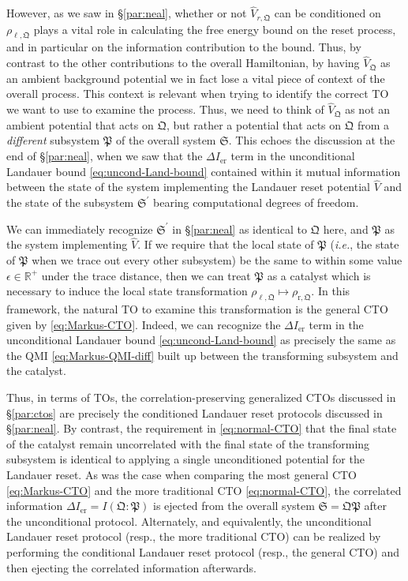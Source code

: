 \documentclass[preprints,article,accept,moreauthors,pdftex]{Definitions/mdpi}
\begin{document}
\begin{paracol}{2}
However, as we saw in \S\ref{par:neal}, whether or not $\widehat{V}_{r,\mathfrak{Q}}$ can be conditioned on $\rho_{\ell,\mathfrak{Q}}$ plays a vital role in calculating the free energy bound on the reset process, and in particular on the information contribution to the bound. Thus, by contrast to the other contributions to the overall Hamiltonian, by having $\widehat{V}_{\mathfrak{Q}}$ as an ambient background potential we in fact lose a vital piece of context of the overall process. This context is relevant when trying to identify the correct TO we want to use to examine the process. Thus, we need to think of $\widehat{V}_{\mathfrak{Q}}$ as not an ambient potential that acts on $\mathfrak{Q}$, but rather a potential that acts on $\mathfrak{Q}$ from a \emph{different} subsystem $\mathfrak{P}$ of the overall system $\mathfrak{S}$. This echoes the discussion at the end of \S\ref{par:neal}, when we saw that the $\Delta I_{\mathrm{er}}$ term in the unconditional Landauer bound \eqref{eq:uncond-Land-bound} contained within it mutual information between the state of the system implementing the Landauer reset potential $\widehat{V}$ and the state of the subsystem $\mathfrak{S}^{\prime}$ bearing computational degrees of freedom.

We can immediately recognize $\mathfrak{S}^{\prime}$ in \S\ref{par:neal} as identical to $\mathfrak{Q}$ here, and $\mathfrak{P}$ as the system implementing $\widehat{V}$. If we require that the local state of $\mathfrak{P}$ (\emph{i.e.}, the state of $\mathfrak{P}$ when we trace out every other subsystem) be the same to within some value $\epsilon \in \mathbb{R}^{+}$ under the trace distance, then we can treat $\mathfrak{P}$ as a catalyst which is necessary to induce the local state transformation $\rho_{\ell,\mathfrak{Q}} \mapsto \rho_{\mathrm{r},\mathfrak{Q}}$. In this framework, the natural TO to examine this transformation is the general CTO given by \eqref{eq:Markus-CTO}. Indeed, we can recognize the $\Delta I_{\mathrm{er}}$ term in the unconditional Landauer bound \eqref{eq:uncond-Land-bound} as precisely the same as the QMI \eqref{eq:Markus-QMI-diff} built up between the transforming subsystem and the catalyst.

Thus, in terms of TOs, the correlation-preserving generalized CTOs discussed in \linebreak\S\ref{par:ctos} are precisely the conditioned Landauer reset protocols discussed in \S\ref{par:neal}. By contrast, the requirement in \eqref{eq:normal-CTO} that the final state of the catalyst remain uncorrelated with the final state of the transforming subsystem is identical to applying a single unconditioned potential for the Landauer reset. As was the case when comparing the most general CTO \eqref{eq:Markus-CTO} and the more traditional CTO \eqref{eq:normal-CTO}, the correlated information $\Delta I_{\mathrm{er}} = I\left(\mathfrak{Q}:\mathfrak{P}\right)$ is ejected from the overall system $\mathfrak{S} = \mathfrak{QP}$ after the unconditional protocol. Alternately, and equivalently, the unconditional Landauer reset protocol (resp., the more traditional CTO) can be realized by performing the conditional Landauer reset protocol (resp., the general CTO) and then ejecting the correlated information afterwards.


\end{paracol}
\end{document}
